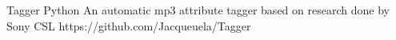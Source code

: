 



\begin{cvprojects}

\cvproject
{Tagger}
{Python}
{
An automatic mp3 attribute tagger based on research done by Sony CSL
}
{https://github.com/Jacqueuela/Tagger}
%


\end{cvprojects}
